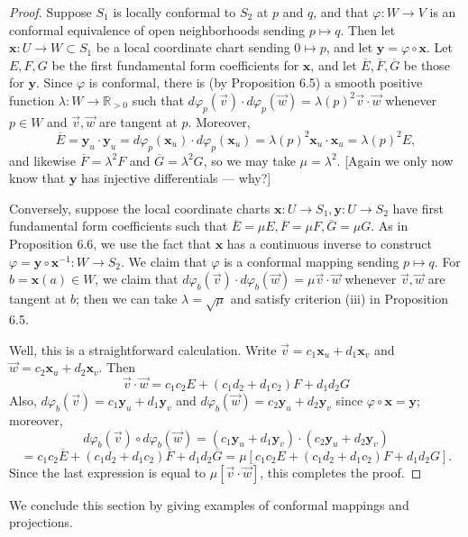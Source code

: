 \documentclass[leqno]{book}
\begin{document}
\begin{proof}
Suppose $S_1$ is locally conformal to $S_2$ at $p$ and $q$, and that $\varphi:W\to V$ is an conformal equivalence of open neighborhoods sending $p\mapsto q$.  Then let $\mathbf x:U\to W\subset S_1$ be a local coordinate chart sending $0\mapsto p$, and let $\mathbf y=\varphi\circ\mathbf x$.  Let $E,F,G$ be the first fundamental form coefficients for $\mathbf x$, and let $\overline E,\overline F,\overline G$ be those for $\mathbf y$.  Since $\varphi$ is conformal, there is (by Proposition 6.5) a smooth positive function $\lambda:W\to\mathbb R_{>0}$ such that $d\varphi_p(\vec v)\cdot d\varphi_p(\vec w)=\lambda(p)^2\vec v\cdot\vec w$ whenever $p\in W$ and $\vec v,\vec w$ are tangent at $p$.  Moreover,
$$\overline E=\mathbf y_u\cdot\mathbf y_u=d\varphi_p(\mathbf x_u)\cdot d\varphi_p(\mathbf x_u)=\lambda(p)^2\mathbf x_u\cdot\mathbf x_u=\lambda(p)^2E,$$
and likewise $\overline F=\lambda^2F$ and $\overline G=\lambda^2G$, so we may take $\mu=\lambda^2$.  [Again we only now know that $\mathbf y$ has injective differentials \---- why?]

Conversely, suppose the local coordinate charts $\mathbf x:U\to S_1,\mathbf y:U\to S_2$ have first fundamental form coefficients such that $\overline E=\mu E,\overline F=\mu F,\overline G=\mu G$.  As in Proposition 6.6, we use the fact that $\mathbf x$ has a continuous inverse to construct $\varphi=\mathbf y\circ\mathbf x^{-1}:W\to S_2$.  We claim that $\varphi$ is a conformal mapping sending $p\mapsto q$.  For $b=\mathbf x(a)\in W$, we claim that $d\varphi_b(\vec v)\cdot d\varphi_b(\vec w)=\mu\vec v\cdot\vec w$ whenever $\vec v,\vec w$ are tangent at $b$; then we can take $\lambda=\sqrt{\mu}$ and satisfy criterion (iii) in Proposition 6.5.

Well, this is a straightforward calculation.  Write $\vec v=c_1\mathbf x_u+d_1\mathbf x_v$ and $\vec w=c_2\mathbf x_u+d_2\mathbf x_v$.  Then
$$\vec v\cdot\vec w=c_1c_2E+(c_1d_2+d_1c_2)F+d_1d_2G$$
Also, $d\varphi_b(\vec v)=c_1\mathbf y_u+d_1\mathbf y_v$ and $d\varphi_b(\vec w)=c_2\mathbf y_u+d_2\mathbf y_v$ since $\varphi\circ\mathbf x=\mathbf y$; moreover,
$$d\varphi_b(\vec v)\circ d\varphi_b(\vec w)=(c_1\mathbf y_u+d_1\mathbf y_v)\cdot(c_2\mathbf y_u+d_2\mathbf y_v)$$
$$=c_1c_2\overline E+(c_1d_2+d_1c_2)\overline F+d_1d_2\overline G=\mu[c_1c_2E+(c_1d_2+d_1c_2)F+d_1d_2G].$$
Since the last expression is equal to $\mu[\vec v\cdot\vec w]$, this completes the proof.
\end{proof}

\noindent We conclude this section by giving examples of conformal mappings and projections.
\end{document}
